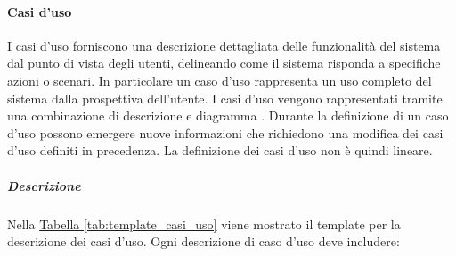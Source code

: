 \paragraph{Casi d'uso}
\label{par:casi_uso}
I casi d'uso forniscono una descrizione dettagliata delle funzionalità del sistema dal punto di vista degli utenti, delineando come il sistema risponda a specifiche azioni o scenari. 
In particolare un caso d'uso rappresenta un uso completo del sistema dalla prospettiva dell'utente.
I casi d'uso vengono rappresentati tramite una combinazione di descrizione e diagramma .
Durante la definizione di un caso d'uso possono emergere nuove informazioni che richiedono una modifica dei casi d'uso definiti in precedenza.
La definizione dei casi d'uso non è quindi lineare.

\subparagraph{Descrizione}
Nella \hyperref[tab:template_casi_uso]{Tabella \ref{tab:template_casi_uso}} viene mostrato il template per la descrizione dei casi d'uso.
Ogni descrizione di caso d'uso deve includere:
